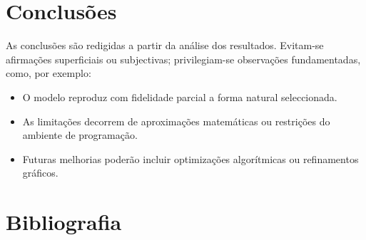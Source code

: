 \documentclass[12pt,a4paper,oneside]{extarticle}
\begin{document}
\section{Conclusões}
As conclusões são redigidas a partir da análise dos resultados.  
Evitam-se afirmações superficiais ou subjectivas; privilegiam-se observações fundamentadas, como, por exemplo:  
\begin{itemize}
    \item O modelo reproduz com fidelidade parcial a forma natural seleccionada.  
    \item As limitações decorrem de aproximações matemáticas ou restrições do ambiente de programação.  
    \item Futuras melhorias poderão incluir optimizações algorítmicas ou refinamentos gráficos.  
\end{itemize}

\section{Bibliografia}
\printbibliography


\label{fim}
\end{document}

